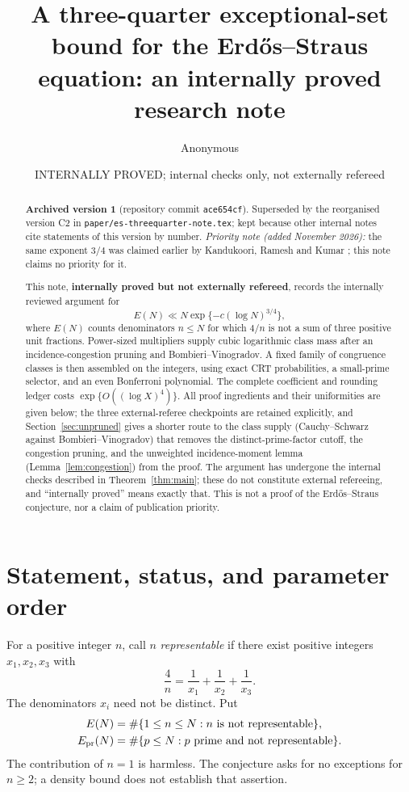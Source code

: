 \documentclass[10pt,reqno]{amsart}
\title[An internally proved three-quarter exceptional-set bound]{A three-quarter exceptional-set bound for the Erd\H{o}s--Straus equation: an internally proved research note}
\author{Anonymous}
\date{INTERNALLY PROVED; internal checks only, not externally refereed}
\theoremstyle{remark}
\begin{document}
\begin{abstract}
\noindent\textbf{Archived version 1} (repository commit \texttt{ace654cf}).
Superseded by the reorganised version C2 in
\texttt{paper/es-threequarter-note.tex}; kept because other internal notes
cite statements of this version by number.
\emph{Priority note (added November 2026):} the same exponent $3/4$ was
claimed earlier by Kandukoori, Ramesh and Kumar \cite{KRK}; this note
claims no priority for it.\par\medskip
This note, \textbf{internally proved but not externally refereed},
records the internally reviewed argument for
\[
 E(N)\ll N\exp\{-c(\log N)^{3/4}\},
\]
where $E(N)$ counts denominators
$n\leq N$ for which $4/n$ is not a sum of three positive unit fractions.
Power-sized multipliers supply cubic logarithmic class mass after an
incidence-congestion pruning and Bombieri--Vinogradov.  A fixed family of
congruence classes is then assembled on the integers, using exact CRT
probabilities, a small-prime selector, and an even Bonferroni polynomial.
The complete coefficient and rounding ledger costs $\exp\{O((\log X)^4)\}$.
All proof ingredients and their uniformities are given below; the three
external-referee checkpoints are retained explicitly, and
Section~\ref{sec:unpruned} gives a shorter route to the class supply
(Cauchy--Schwarz against Bombieri--Vinogradov) that removes the
distinct-prime-factor cutoff, the congestion pruning, and the unweighted
incidence-moment lemma (Lemma~\ref{lem:congestion}) from the proof.  The
argument has undergone the internal checks described in
Theorem~\ref{thm:main}; these do not constitute external refereeing,
and ``internally proved'' means exactly that.  This is not a proof of the
Erd\H{o}s--Straus conjecture, nor a claim of publication priority.
\end{abstract}
\maketitle

\section{Statement, status, and parameter order}\label{sec:intro}
For a positive integer $n$, call $n$ \emph{representable} if there exist
positive integers $x_1,x_2,x_3$ with
\begin{equation}\label{eq:ES}
 \frac4n=\frac1{x_1}+\frac1{x_2}+\frac1{x_3}.
\end{equation}
The denominators $x_i$ need not be distinct.  Put
\[
 \begin{aligned}
 E(N)&=\#\{1\leq n\leq N:n\text{ is not representable}\},\\
 E_{\rm pr}(N)&=\#\{p\leq N:p\text{ prime and not representable}\}.
 \end{aligned}
\]
The contribution of $n=1$ is harmless.  The conjecture asks for no
exceptions for $n\geq2$; a density bound does not establish that assertion.
\end{document}
